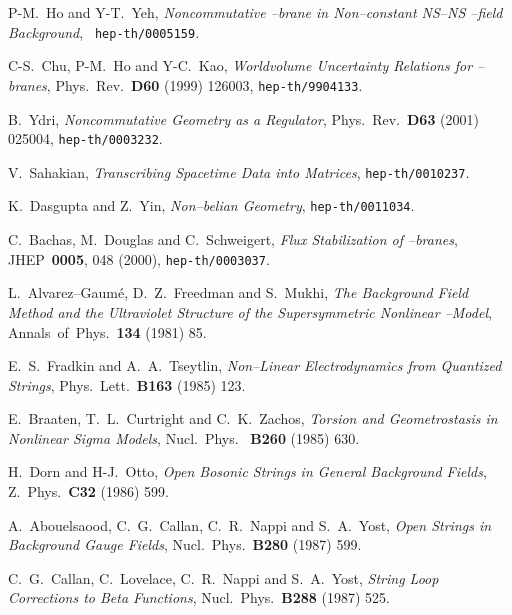 \documentclass[a4paper,11pt]{article}
\begin{document}
\begin{thebibliography}{99}
{  {\small P-M.~Ho and Y-T.~Yeh, \textit{Noncommutative 
\coordHE{}--brane in Non--constant NS--NS \coordHE{}--field Background}, \texttt{
hep-th/0005159}. }

  {\small C-S.~Chu, P-M.~Ho and Y-C.~Kao, \textit{
Worldvolume Uncertainty Relations for \coordHE{}--branes}, Phys.\ Rev.\ \textbf{D60}
(1999) 126003, \texttt{hep-th/9904133}. }

  {\small B.~Ydri, \textit{Noncommutative Geometry as a
Regulator}, Phys.\ Rev.\ \textbf{D63} (2001) 025004,
\texttt{hep-th/0003232}. }

  {\small V.~Sahakian, \textit{Transcribing Spacetime Data
into Matrices}, \texttt{hep-th/0010237}. }

  {\small K.~Dasgupta and Z.~Yin, \textit{
Non--\coordHE{}belian Geometry}, \texttt{hep-th/0011034}. }

 {\small C.~Bachas, M.~Douglas and C.~Schweigert, \textit{Flux
Stabilization of \coordHE{}--branes}, JHEP\ \textbf{0005}, 048 (2000),
\texttt{hep-th/0003037}. }

  {\small L.~Alvarez--Gaum\'e, D.~Z.~Freedman and S.~Mukhi, 
\textit{The Background Field Method and the Ultraviolet Structure of the
Supersymmetric Nonlinear \myHighlight{$\sigma$}\coordHE{}--Model}, Annals\ of\ Phys.\ \textbf{134}
(1981) 85. }

  {\small E.~S.~Fradkin and A.~A.~Tseytlin, 
\textit{Non--Linear Electrodynamics from Quantized Strings}, Phys.\ Lett.\ 
\textbf{B163} (1985) 123. }

  {\small E.~Braaten, T.~L.~Curtright and C.~K.~Zachos, \textit{
Torsion and Geometrostasis in Nonlinear Sigma Models}, Nucl.\ Phys.\ \textbf{
B260} (1985) 630. }

  {\small H.~Dorn and H-J.~Otto, \textit{Open Bosonic
Strings in General Background Fields}, Z.\ Phys.\ \textbf{C32} (1986) 599. }

  {\small A.~Abouelsaood, C.~G.~Callan, C.~R.~Nappi and
S.~A.~Yost, \textit{Open Strings in Background Gauge Fields}, Nucl.\ Phys.\ 
\textbf{B280} (1987) 599. }

  {\small C.~G.~Callan, C.~Lovelace, C.~R.~Nappi and
S.~A.~Yost, \textit{String Loop Corrections to Beta Functions}, Nucl.\
Phys.\ \textbf{B288} (1987) 525. }

}
\end{thebibliography}
\end{document}
